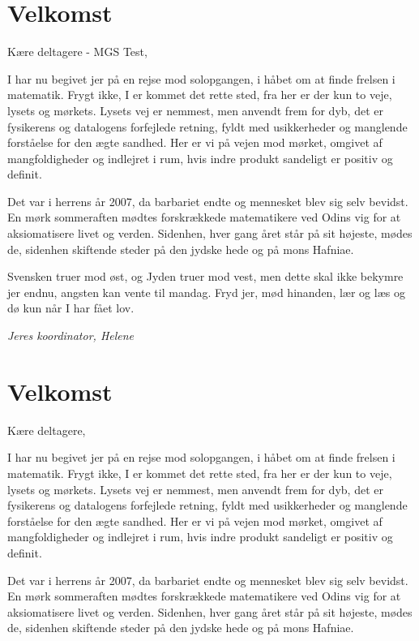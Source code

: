 \documentclass[article,10pt,a4,oneside]{memoir}
\begin{document}
\begin{minipage}[b]{0.95\textwidth}
\begin{minipage}[t]{0.47\textwidth}
\vspace{3mm}

\section*{Velkomst}
Kære deltagere - MGS Test,

I har nu begivet jer på en rejse mod solopgangen, i håbet om at finde frelsen i matematik. Frygt ikke, I er kommet det rette sted, fra her er der kun to veje, lysets og mørkets. Lysets vej er nemmest, men anvendt frem for dyb, det er fysikerens og datalogens forfejlede retning, fyldt med usikkerheder og manglende forståelse for den ægte sandhed. Her er vi på vejen mod mørket, omgivet af mangfoldigheder og indlejret i rum, hvis indre produkt sandeligt er positiv og definit.

Det var i herrens år 2007, da barbariet endte og mennesket blev sig selv bevidst. En mørk sommeraften mødtes forskrækkede matematikere ved Odins vig for at aksiomatisere livet og verden. Sidenhen, hver gang året står på sit højeste, mødes de, sidenhen skiftende steder på den jydske hede og på mons Hafniae.

Svensken truer mod øst, og Jyden truer mod vest, men dette skal ikke bekymre jer endnu, angsten kan vente til mandag. Fryd jer, mød hinanden, lær og læs og dø kun når I har fået lov. 

{\flushright\emph{Jeres koordinator, Helene}}

\section*{Velkomst}
Kære deltagere,

I har nu begivet jer på en rejse mod solopgangen, i håbet om at finde frelsen i matematik. Frygt ikke, I er kommet det rette sted, fra her er der kun to veje, lysets og mørkets. Lysets vej er nemmest, men anvendt frem for dyb, det er fysikerens og datalogens forfejlede retning, fyldt med usikkerheder og manglende forståelse for den ægte sandhed. Her er vi på vejen mod mørket, omgivet af mangfoldigheder og indlejret i rum, hvis indre produkt sandeligt er positiv og definit.

Det var i herrens år 2007, da barbariet endte og mennesket blev sig selv bevidst. En mørk sommeraften mødtes forskrækkede matematikere ved Odins vig for at aksiomatisere livet og verden. Sidenhen, hver gang året står på sit højeste, mødes de, sidenhen skiftende steder på den jydske hede og på mons Hafniae.


\end{minipage}
\end{minipage}
\end{document}

